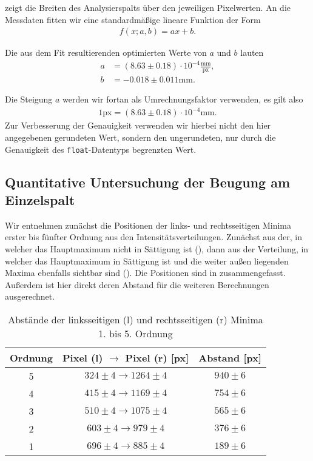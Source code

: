 zeigt die Breiten des Analysierspalts über den jeweiligen Pixelwerten. An die Messdaten fitten wir eine standardmäßige lineare Funktion der Form
\begin{align}
  f(x;a,b) = ax + b.
\end{align}

Die aus dem Fit resultierenden optimierten Werte von $a$ und $b$ lauten
\begin{align}
  a &= (8.63 \pm 0.18) \cdot 10^{-4} \frac{\si{\milli\meter}}{\mathrm{px}},\\[1em]
  b &= -0.018 \pm 0.011 \si{\milli\meter}.
\end{align}

Die Steigung $a$ werden wir fortan als Umrechnungsfaktor verwenden, es gilt also
\begin{align}
  1\mathrm{px} = (8.63 \pm 0.18) \cdot 10^{-4}\si{\milli\meter}.
\end{align}
Zur Verbesserung der Genauigkeit verwenden wir hierbei nicht den hier angegebenen gerundeten Wert, sondern den ungerundeten, nur durch die Genauigkeit des \texttt{float}-Datentyps begrenzten Wert.

\subsection{Quantitative Untersuchung der Beugung am Einzelspalt}

Wir entnehmen zunächst die Positionen der links- und rechtsseitigen Minima erster bis fünfter Ordnung aus den Intensitätsverteilungen. Zunächst aus der, in welcher das Hauptmaximum nicht in Sättigung ist (), dann aus der Verteilung, in welcher das Hauptmaximum in Sättigung ist und die weiter außen liegenden Maxima ebenfalls sichtbar sind (). Die Positionen sind in \tabref{} zusammengefasst. Außerdem ist hier direkt deren Abstand für die weiteren Berechnungen ausgerechnet.

\begin{table}[H]
  \centering
  \caption{Abstände der linksseitigen (l) und rechtsseitigen (r) Minima 1. bis 5. Ordnung}
  \vspace*{0.5em}
  \begin{tabular}{c|c|c}
    Ordnung & Pixel (l) $\to$ Pixel (r) [px] & Abstand [px]\\\hline
    5 & $324 \pm 4 \to 1264 \pm 4$ & $940 \pm 6$\\
    4 & $415 \pm 4 \to 1169 \pm 4$ & $754 \pm 6$\\
    3 & $510 \pm 4 \to 1075 \pm 4$ & $565 \pm 6$\\
    2 & $603 \pm 4 \to 979 \pm 4$ & $376 \pm 6$\\
    1 & $696 \pm 4 \to 885 \pm 4$ & $189 \pm 6$
  \end{tabular}
\end{table}

